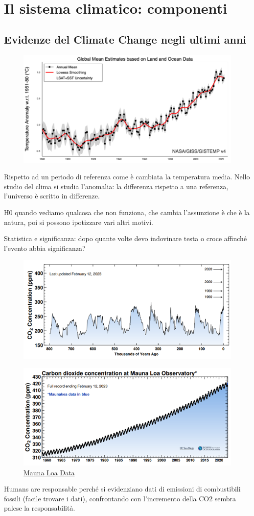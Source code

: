 \chapter{Il sistema climatico: componenti}
\section{Evidenze del Climate Change negli ultimi anni}
\begin{figure}[htpb]
    \centering
    \includegraphics[width=0.5\linewidth]{uploads/CC.png}
\end{figure}
Rispetto ad un periodo di referenza come è cambiata la temperatura media. Nello studio del clima si studia l’anomalia: la differenza rispetto a una referenza, l’universo è scritto in differenze. 

H0 quando vediamo qualcosa che non funziona, che cambia l’assunzione è che è la natura, poi si possono ipotizzare vari altri motivi.

Statistica e significanza: dopo quante volte devo indovinare testa o croce affinché l’evento abbia significanza?
\begin{figure}[htpb]
    \centering
    \includegraphics[width=0.5\linewidth]{uploads/CO2 concentration.png}
\end{figure}
\begin{figure}[htpb]
    \centering
    \includegraphics[width=0.5\linewidth]{uploads/manua loa.png}
    \caption{\href{http://keelingcurve.ucsd.edu }{Mauna Loa Data}}
\end{figure}
Humans are responsable perché si evidenziano dati di emissioni di combustibili fossili (facile trovare i dati), confrontando con l’incremento della CO2 sembra palese la responsabilità. 

